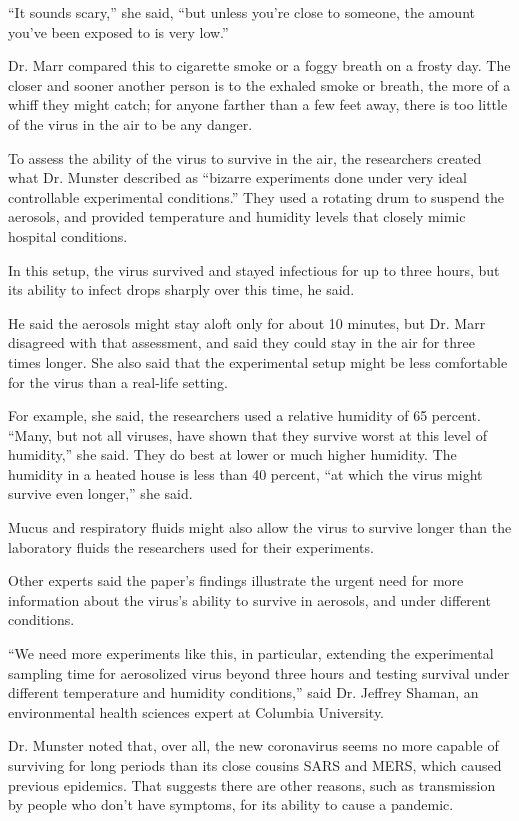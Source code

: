 ``It sounds scary,'' she said, ``but unless you're close to someone, the
amount you've been exposed to is very low.''

Dr. Marr compared this to cigarette smoke or a foggy breath on a frosty
day. The closer and sooner another person is to the exhaled smoke or
breath, the more of a whiff they might catch; for anyone farther than a
few feet away, there is too little of the virus in the air to be any
danger.

To assess the ability of the virus to survive in the air, the
researchers created what Dr. Munster described as ``bizarre experiments
done under very ideal controllable experimental conditions.'' They used
a rotating drum to suspend the aerosols, and provided temperature and
humidity levels that closely mimic hospital conditions.

In this setup, the virus survived and stayed infectious for up to three
hours, but its ability to infect drops sharply over this time, he said.

He said the aerosols might stay aloft only for about 10 minutes, but Dr.
Marr disagreed with that assessment, and said they could stay in the air
for three times longer. She also said that the experimental setup might
be less comfortable for the virus than a real-life setting.

For example, she said, the researchers used a relative humidity of 65
percent. ``Many, but not all viruses, have shown that they survive worst
at this level of humidity,'' she said. They do best at lower or much
higher humidity. The humidity in a heated house is less than 40 percent,
``at which the virus might survive even longer,'' she said.

Mucus and respiratory fluids might also allow the virus to survive
longer than the laboratory fluids the researchers used for their
experiments.

Other experts said the paper's findings illustrate the urgent need for
more information about the virus's ability to survive in aerosols, and
under different conditions.

``We need more experiments like this, in particular, extending the
experimental sampling time for aerosolized virus beyond three hours and
testing survival under different temperature and humidity conditions,''
said Dr. Jeffrey Shaman, an environmental health sciences expert at
Columbia University.

Dr. Munster noted that, over all, the new coronavirus seems no more
capable of surviving for long periods than its close cousins SARS and
MERS, which caused previous epidemics. That suggests there are other
reasons, such as transmission by people who don't have symptoms, for its
ability to cause a pandemic.

